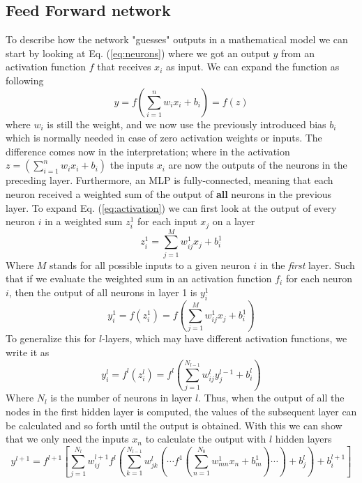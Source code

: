 \documentclass[12pt, a4paper]{book}
\begin{document}
\subsection{Feed Forward network}\label{sec:FFN}
To describe how the network "guesses" outputs in a mathematical model we can start by looking at Eq. (\ref{eq:neurons}) where we got an output $y$ from an activation function $f$ that receives $x_i$ as input. 
We can expand the function as following
\begin{equation}\label{eq:activation}
    y=f\left(\sum_{i=1}^nw_ix_i+b_i\right)=f(z)
\end{equation} 
where $w_i$ is still the weight, and we now use the previously introduced bias $b_i$ which is normally needed in case of zero activation weights or inputs. The difference comes now in the interpretation; where in the activation 
$z=(\sum_{i=1}^nw_ix_i+b_i)$ the inputs $x_i$ are now the outputs of the neurons in the preceding layer. Furthermore, an MLP is fully-connected, meaning that each neuron received a weighted sum of the output of \textbf{all} 
neurons in the previous layer. To expand Eq. (\ref{eq:activation}) we can first look at the output of every neuron $i$ in a weighted sum $z^1_i$ for each input $x_j$ on a layer
\begin{equation}\label{eq:weightedsum}
    z_i^1=\sum_{j=1}^Mw_{ij}^1x_j + b^1_i
\end{equation}
Where $M$ stands for all possible inputs to a given neuron $i$ in the \textit{first} layer. Such that if we evaluate the weighted sum in an activation function $f_i$ for each neuron $i$, 
then the output of all neurons in layer 1 is $y_i^1$
$$
    y^1_i=f(z_i^1)=f\left(\sum_{j=1}^Mw_{ij}^1x_j + b^1_i\right)
$$
To generalize this for $l$-layers, which may have different activation functions, we write it as
$$
    y^l_i=f^l(z_i^l)=f^l\left(\sum_{j=1}^{N_{l-1}}w_{ij}^ly^{l-1}_j + b^l_i\right)
$$
Where $N_l$ is the number of neurons in layer $l$. Thus, when the output of all the nodes in the first hidden layer is computed, the values of the subsequent layer can be calculated and so forth until the output is obtained. 
With this we can show that we only need the inputs $x_n$ to calculate the output with $l$ hidden layers
\begin{equation}\label{eq:MLP}
    y^{l+1}=f^{l+1}\left[\sum_{j=1}^{N_l}w^{l+1}_{ij}f^l\left(\sum_{k=1}^{N_{l-1}}w^{l}_{jk}\left(\cdots f^{1}\left(\sum_{n=1}^{N_0}w^1_{mn}x_n+b_m^1\right)\cdots\right)+b_j^{l}\right)+b^{l+1}_i   \right]
\end{equation}
\end{document}

